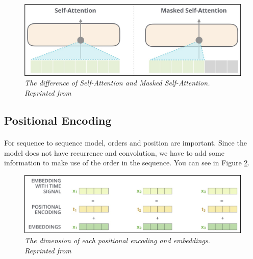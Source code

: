 \begin{figure}[H]
  \centering
  \caption[The difference of Self-Attention and Masked Self-Attention.]{\emph{The difference of Self-Attention and Masked Self-Attention. \\ Reprinted from \citeauthor{alammar_2019} \citeyear{alammar_2019}}}\label{fig:attention_6}
  \includegraphics[scale = 0.3]{figures/attention_6.jpg}  
\end{figure}
\subsection{Positional Encoding}
\paragraph{}
For sequence to sequence model, orders and position are important. Since the model does not have recurrence and convolution, we have to add some information to make use of the order in the sequence. You can see in Figure \ref{fig:attention_7}.

\begin{figure}[H]
  \centering
  \caption[The dimension of each positional encoding and embeddings.]{\emph{The dimension of each positional encoding and embeddings. \\ Reprinted from \citeauthor{alammar_2018} \citeyear{alammar_2018}}}\label{fig:attention_7}
  \includegraphics[scale = 0.4]{figures/attention_7.jpg}  
\end{figure}


\FloatBarrier